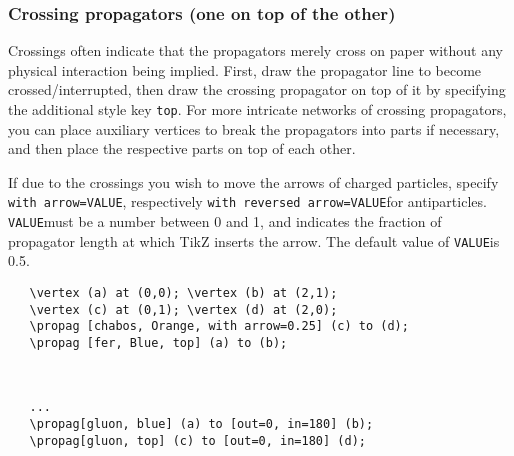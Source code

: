 \documentclass[10pt,letterpaper,twoside,notitlepage]{article}
\numberwithin{figure}{section}
\begin{document}
\subsubsection{Crossing propagators (one on top of the other)}
\label{sec:_feynmandiagrams_propagators_top}
%
\noindent
Crossings often indicate that the propagators merely cross on paper
without any physical interaction being implied.
First, draw the propagator line to become crossed/interrupted,
then draw the crossing propagator on top of it by specifying 
the additional style key \blucol\verb$top$\txcol.
For more intricate networks of crossing propagators, you can place auxiliary vertices 
to break the propagators into parts if necessary, 
and then place the respective parts on top of each other.

If due to the crossings you wish to move the arrows of charged particles,
specify \blucol\verb$with arrow=VALUE$\txcol,
respectively \blucol\verb$with reversed arrow=VALUE$\txcol for antiparticles.
\blucol\verb$VALUE$\txcol must be a number between 0 and 1,
and indicates the fraction of propagator length at which TikZ inserts the arrow.
The default value of \blucol\verb$VALUE$\txcol is 0.5.
\vspace{2mm}\\
%
\begin{minipage}{0.8\linewidth}
\blucol\begin{verbatim}
   \vertex (a) at (0,0); \vertex (b) at (2,1);
   \vertex (c) at (0,1); \vertex (d) at (2,0);
   \propag [chabos, Orange, with arrow=0.25] (c) to (d);
   \propag [fer, Blue, top] (a) to (b);
\end{verbatim}\txcol
\end{minipage}
%
\begin{minipage}{0.15\linewidth}
\end{minipage}
\\
%
\begin{minipage}{0.8\linewidth}
\blucol\begin{verbatim}
   ...
   \propag[gluon, blue] (a) to [out=0, in=180] (b);
   \propag[gluon, top] (c) to [out=0, in=180] (d);
\end{verbatim}\txcol
\end{minipage}
\end{document}
